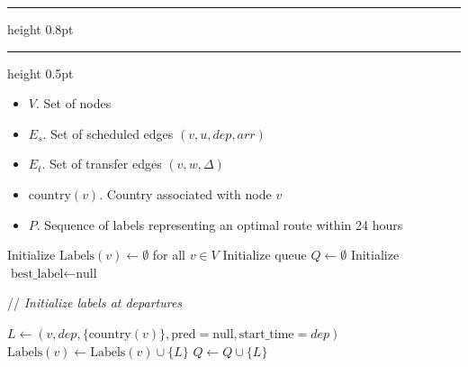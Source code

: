 \documentclass{article}
\newcommand{\CommentLine}[1]{
    \State // \textit{#1}
}
\begin{document}
\pagestyle{empty}
\allowdisplaybreaks[1] 
\setcounter{page}{1}


\begin{center}
    \hrule height 0.8pt
    \vspace{0.3em}
    \label{alg:baseline_label_setting}
    \vspace{0.2em}
    \hrule height 0.5pt
\end{center}

\begin{algorithmic}[1] %
    
    \Input
    \begin{itemize}
        \item $V$. Set of nodes
        \item $E_s$. Set of scheduled edges $(v,u,dep,arr)$
        \item $E_t$. Set of transfer edges $(v,w,\Delta)$
        \item $\text{country}(v)$. Country associated with node $v$
    \end{itemize}

    \Output
    \begin{itemize}
        \item $P$. Sequence of labels representing an optimal route within 24 hours
    \end{itemize}
    \vspace{0.5em} 

    \State Initialize $\text{Labels}(v) \leftarrow \emptyset$ for all $v \in V$
    \State Initialize queue $Q \leftarrow \emptyset$
    \State Initialize $\text{best\_label} \leftarrow \text{null}$

    \vspace{0.5em}
    \CommentLine{Initialize labels at departures}
            \State $L \leftarrow (v,dep,\{\text{country}(v)\},\text{pred}=\text{null},\text{start\_time}=dep)$
            \State $\text{Labels}(v) \leftarrow \text{Labels}(v) \cup \{L\}$
            \State $Q \leftarrow Q \cup \{L\}$
        \EndFor
    \EndFor


\end{algorithmic}
\end{document}
